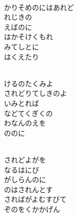 \documentclass[10pt,b5j]{tarticle} %
\begin{document}
\begin{enumerate}
\begin{minipage}[c]{\blocksize}
        \vspace{\linespace}
        \item~\\
        かりそめのにはあれど\\
        れじきの\\
        えばのに\\
        はかそけくもれ\\
        みてしとに\\
        はくえたり
        
        \vspace{\linespace}
        \item~\\
        けるのたくみよ\\
        されどりてしきのよ\\
        いみとれば\\
        などてくぎくの\\
        わなんのえを\\
        ののに
        
        \vspace{\linespace}
        \item~\\
        されどよがを\\
        なるはにび\\
        がしらんのに\\
        のはされんとす\\
        さればがよむすびて\\
        ぞのをくかかげん
    
    \end{minipage}
\end{enumerate} %
\end{document}
